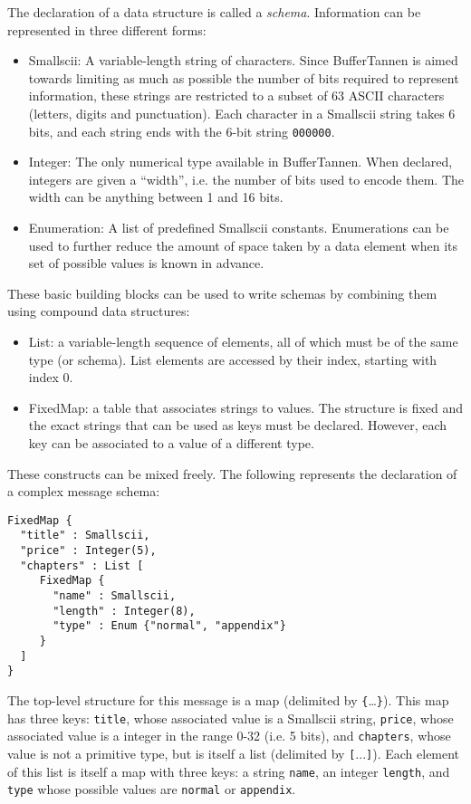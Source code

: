 The declaration of a data structure is called a \emph{schema}. Information can be represented in three different forms:

\begin{itemize}
\item Smallscii: A variable-length string of characters. Since BufferTannen is aimed towards limiting as much as possible the number of bits required to represent information, these strings are restricted to a subset of 63 ASCII characters (letters, digits and punctuation). Each character in a Smallscii string takes 6 bits, and each string ends with the 6-bit string \verb+000000+.

\item Integer: The only numerical type available in BufferTannen. When declared, integers are given a ``width'', i.e. the number of bits used to encode them. The width can be anything between 1 and 16 bits.

\item Enumeration: A list of predefined Smallscii constants. Enumerations can be used to further reduce the amount of space taken by a data element when its set of possible values is known in advance.
\end{itemize}

These basic building blocks can be used to write schemas by combining them using compound data structures:

\begin{itemize}
\item List: a variable-length sequence of elements, all of which must be of the same type (or schema). List elements are accessed by their index, starting
  with index 0.
\item FixedMap: a table that associates strings to values. The structure is fixed and the exact strings that can be used as keys must be declared. However, each key can be associated to a value of a different type.
\end{itemize}

These constructs can be mixed freely. The following represents the declaration of a complex message schema:

\begin{verbatim}
FixedMap {
  "title" : Smallscii,
  "price" : Integer(5),
  "chapters" : List [
     FixedMap {
       "name" : Smallscii,
       "length" : Integer(8),
       "type" : Enum {"normal", "appendix"}
     }
  ]
}
\end{verbatim}

The top-level structure for this message is a map (delimited by \verb+{+\dots\verb+}+). This map has three keys: \verb+title+, whose associated value is a Smallscii string, \verb+price+, whose associated value is a integer in the range 0-32 (i.e. 5 bits), and \verb+chapters+, whose value is not a primitive type, but is itself a list (delimited by \verb+[+...\verb+]+). Each element of this list is itself a map with three keys: a string \verb+name+, an integer \verb+length+, and \verb+type+ whose possible values are \verb+normal+ or \verb+appendix+.

